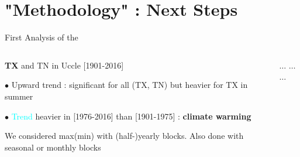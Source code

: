 \documentclass[9pt,xcolor={dvipsnames}]{beamer}
\begin{document}
\section{"Methodology" : Next Steps}


\begin{frame}{First Analysis of the }
\begin{columns}[c]
	\begin{column}{.5\textwidth}
		\centering
{}
	\begin{todolist}
		\item \textbf{TX} and TN in Uccle [1901-2016]
\small
		\item[$\bullet$] Upward trend : significant for all (TX, TN) but heavier for TX in summer
       \item[$\bullet$] \textcolor{cyan}{Trend} heavier in [1976-2016] than [1901-1975] : \textbf{climate warming}
	\end{todolist}
	\vspace{.4cm}
	\begin{todolist}
	\item We considered max(min) with (half-)yearly blocks. Also done with seasonal or monthly blocks
	\end{todolist}
	\end{column}

	\begin{column}{.6\textwidth}
	
	\centering
{}
\newline
\newline
$\dots$ \quad $\dots$ \quad $\dots$
	\end{column}
 \end{columns}

\end{frame}
\end{document}
